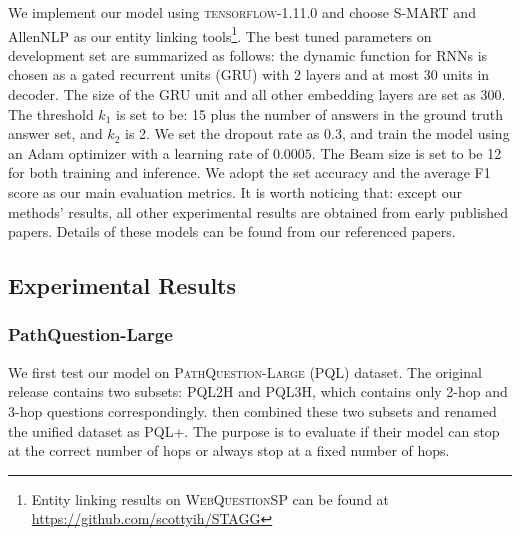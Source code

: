 We implement our model using \textsc{tensorflow-1.11.0} and choose S-MART \cite{DBLP:journals/corr/YangC16a} and AllenNLP \cite{Gardner2017AllenNLP} as our entity linking tools\footnote{Entity linking results on \textsc{WebQuestionSP} can be found at \url{https://github.com/scottyih/STAGG}}. The best tuned parameters on development set are summarized as follows: the dynamic function for RNNs is chosen as a gated recurrent units (GRU) with 2 layers and at most 30 units in decoder. The size of the GRU unit and all other embedding layers are set as 300. The threshold $k_1$ is set to be: 15 plus the number of answers in the ground truth answer set, and $k_2$ is 2. We set the dropout rate as 0.3, and train the model using an Adam optimizer with a learning rate of $0.0005$. The Beam size is set to be 12 for both training and inference. We adopt the set accuracy and the average F1 score as our main evaluation metrics. %
It is worth noticing that: except our methods' results, all other experimental results are obtained from early published papers. Details of these models can be found from our referenced papers.



\subsection{Experimental Results}
\subsubsection{PathQuestion-Large} 
We first test our model on \textsc{PathQuestion-Large} (PQL) dataset. The original release contains two subsets: PQL2H and PQL3H, which contains only 2-hop and 3-hop questions correspondingly.  then combined these two subsets and renamed the unified dataset as PQL+. The purpose is to evaluate if their model can stop at the correct number of hops or always stop at a fixed number of hops.

